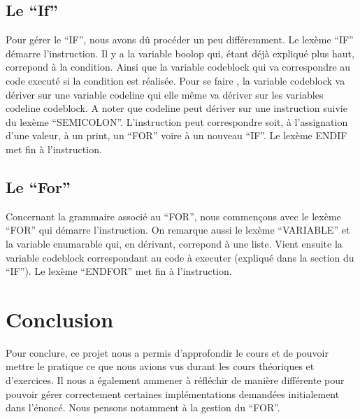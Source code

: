 \documentclass[10pt,a4paper]{article}
\begin{document}
	\subsection{Le ``If''}
	Pour gérer le ``IF'', nous avons dû procéder un peu différemment. Le lexème ``IF'' démarre l'instruction. Il y a la variable boolop qui, 
	étant déjà expliqué plus haut, correpond à la condition.
	Ainsi que la variable codeblock qui va correspondre au code executé si la condition est réalisée. Pour se faire , la variable codeblock va dériver
	sur une variable codeline qui elle même va dériver sur les variables codeline codeblock. A noter que codeline peut dériver sur une instruction
	suivie du lexème ``SEMICOLON''. L'instruction peut correspondre soit, à l'assignation d'une valeur, à un print, un ``FOR'' voire à un nouveau ``IF''.
	Le lexème ENDIF met fin à l'instruction.
	\\
	\subsection{Le ``For''}
	Concernant la grammaire associé au ``FOR'', nous commençons avec le lexème ``FOR'' qui démarre l'instruction.
	On remarque aussi le lexème ``VARIABLE'' et la variable enumarable qui, en dérivant, correpond à une liste.
	Vient ensuite la variable codeblock correspondant au code à executer (expliqué dans la section du ``IF''). Le lexème ``ENDFOR'' 
	met fin à l'instruction.
	\\
	\section{Conclusion}
	Pour conclure, ce projet nous a permis d'approfondir le cours et de pouvoir mettre le pratique ce que nous avions vus durant les cours théoriques 
	et d'exercices. Il nous a également ammener à réfléchir de manière différente pour pouvoir gérer correctement certaines implémentations demandées
	initialement dans l'énoncé. Nous pensons notamment à la gestion du ``FOR''.
	
\end{document}
